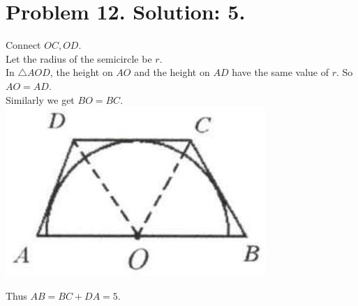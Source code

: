 \documentclass[10pt]{article}
\begin{document}
\section*{Problem 12. Solution: 5.}
Connect \(O C, O D\).\\
Let the radius of the semicircle be \(r\).\\
In \(\triangle A O D\), the height on \(A O\) and the height on \(A D\) have the same value of \(r\). So \(A O=A D\).\\
Similarly we get \(B O=B C\).\\
\includegraphics[max width=\textwidth, center]{2025_04_17_97bc1f7e44d93c271a88g-160(1)}

Thus \(A B=B C+D A=5\).
\end{document}
